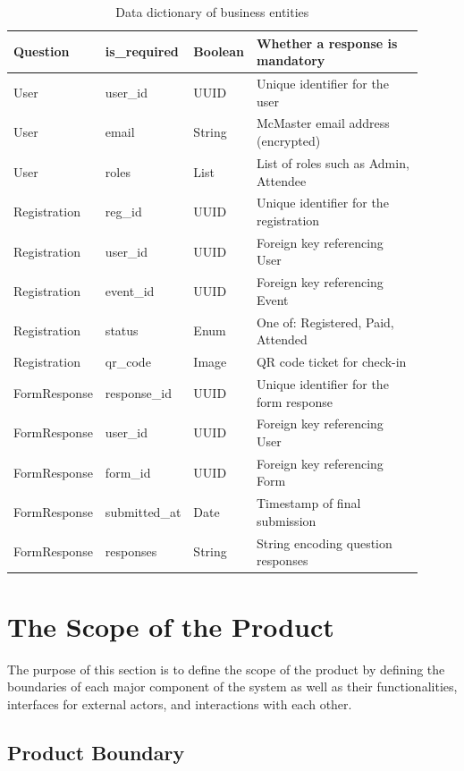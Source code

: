 \documentclass[12pt]{article}
\begin{document}
\begin{table}[H]
\begin{tabular}{p{0.15\linewidth}p{0.15\linewidth}p{0.1\linewidth}p{0.51\linewidth}}
  Question   & is\_required    & Boolean & Whether a response is mandatory \\
  \midrule
  User       & user\_id        & UUID  & Unique identifier for the user \\
  User       & email           & String & McMaster email address (encrypted) \\
  User       & roles           & List   & List of roles such as Admin, Attendee \\
  \midrule
  Registration & reg\_id       & UUID  & Unique identifier for the registration \\
  Registration & user\_id      & UUID  & Foreign key referencing User \\
  Registration & event\_id     & UUID  & Foreign key referencing Event \\
  Registration & status        & Enum  & One of: Registered, Paid, Attended \\
  Registration & qr\_code      & Image & QR code ticket for check-in \\
  \midrule
  FormResponse & response\_id  & UUID     & Unique identifier for the form response \\
  FormResponse & user\_id      & UUID     & Foreign key referencing User \\
  FormResponse & form\_id      & UUID     & Foreign key referencing Form \\
  FormResponse & submitted\_at & Date & Timestamp of final submission \\
  FormResponse & responses     & String   & String encoding question responses \\
  \bottomrule
\end{tabular}
\caption{Data dictionary of business entities}\label{table:datadictionary}
\end{table}

\section{The Scope of the Product}

The purpose of this section is to define the scope of the product by defining the boundaries of each major component of the system as well as their functionalities, interfaces for external actors, and interactions with each other.

\subsection{Product Boundary}
\end{document}
